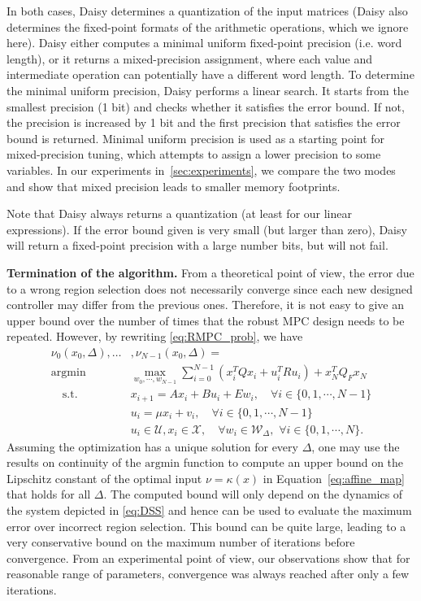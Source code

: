 In both cases, Daisy determines a quantization of the input matrices (Daisy also
determines the fixed-point formats of the arithmetic operations, which we ignore here).
Daisy either computes a minimal uniform fixed-point precision (i.e. word length),
or it returns a mixed-precision assignment, where each value and
intermediate operation can potentially have a different word length.
To determine the minimal uniform precision, Daisy performs a linear search.
It starts from the smallest precision (1 bit) and checks whether it satisfies the
error bound. If not, the precision is increased by 1 bit and the first precision
that satisfies the error bound is returned.
Minimal uniform precision is used as a starting point for mixed-precision tuning,
which attempts to assign a lower precision to some variables. 
In our experiments in~\autoref{sec:experiments}, we compare the two modes and show
that mixed precision leads to smaller memory footprints.

Note that Daisy always returns a quantization (at least for our linear
expressions). If the error bound given is very small (but larger than zero),
Daisy will return a fixed-point precision with a large number bits, but will not
fail.

\smallskip
\noindent
\textbf{Termination of the algorithm.}
From a theoretical point of view, the error due to a wrong region selection does not necessarily converge since each new designed controller may differ from the previous ones. Therefore, it is not easy to give an upper bound over the number of times that the robust MPC design needs to be repeated. However, by rewriting \autoref{eq:RMPC_prob}, we have
\begin{align*}
\nu_0(x_0, \Delta),\ldots&,\nu_{N-1}(x_0,\Delta)=\\
\mathrm{argmin} & \max_{w_0,\cdots,w_{N-1}} \sum_{i=0}^{N-1}(x_i^TQx_i+u_i^TRu_i) + x_N^TQ_Fx_N\nonumber\\
\quad  \text{s.t.} \quad & x_{i+1}=Ax_i+Bu_i + E w_i, \quad\forall i\in\{0,1,\cdots,N-1\}\nonumber\\
\quad \quad & u_i=\mu x_i+v_i, \quad\forall i\in\{0,1,\cdots,N-1\}\nonumber\\
\quad \quad & u_i\in\mathcal{U},x_i\in\mathcal{X},\quad \forall w_i\in\mathcal{W}_{\Delta},\,\,\forall i\in\{0,1,\cdots,N\}.
\end{align*}
Assuming the optimization has a unique solution for every $\Delta$, 
one may use the results on continuity of the $\mathrm{argmin}$ function to compute an upper bound on the 
Lipschitz constant of the optimal input $\nu = \kappa(x)$ in Equation~\eqref{eq:affine_map} that holds for all $\Delta$. 
The computed bound will only depend on the dynamics of the system depicted in \autoref{eq:DSS} and hence can be used 
to evaluate the maximum error over incorrect region selection. 
This bound can be quite large, leading to a very conservative bound on the maximum number of iterations before convergence. 
From an experimental point of view, our observations show that for reasonable range of parameters, convergence was
always reached after only a few iterations.

